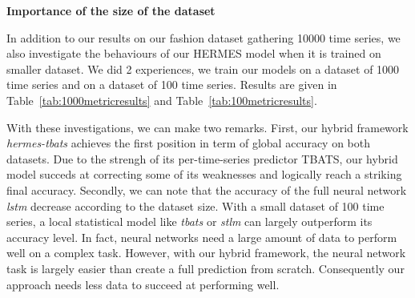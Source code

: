 \documentclass{article} %
\begin{document}
\textbf{Importance of the size of the dataset}

In addition to our results on our fashion dataset gathering 10000 time series, we also investigate the behaviours of our HERMES model when it is trained on smaller dataset. We did 2 experiences, we train our models on a dataset of 1000 time series and on a dataset of 100 time series. Results are given in Table~\ref{tab:1000metricresults} and Table~\ref{tab:100metricresults}.

With these investigations, we can make two remarks. First, our hybrid framework \textit{hermes-tbats} achieves the first position in term of global accuracy on both datasets. Due to the strengh of its per-time-series predictor TBATS, our hybrid model succeds at correcting some of its weaknesses and logically reach a striking final accuracy. Secondly, we can note that the accuracy of the full neural network \textit{lstm} decrease according to the dataset size. With a small dataset of 100 time series, a local statistical model like \textit{tbats} or \textit{stlm} can largely outperform its accuracy level. In fact, neural networks need a large amount of data to perform well on a complex task. However, with our hybrid framework, the neural network task is largely easier than create a full prediction from scratch. Consequently our approach needs less data to succeed at performing well.


\begin{table}
  \caption{Results summary on our 1000ts Fashion dataset.For each metric, we compute the average on all our time series. For our two apporaches using neural network, we trained 10 models with different seeds and we display the mean and the standard deviation of our 10 results.}
  \centering
\label{tab:1000metricresults}
\end{table}
\end{document}
